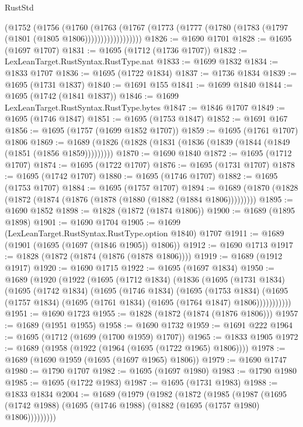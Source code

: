 \begin{lexlean}{RustStd}
\begin{coremodule}
                (@1752
                  (@1756
                    (@1760
                      (@1763
                        (@1767
                          (@1773 (@1777 (@1780 (@1783 (@1797 (@1801 (@1805 @1806))))))))))))))))))
@1826 := @1690 @1701
@1828 := @1695 (@1697 @1707)
@1831 := @1695 (@1712 (@1736 @1707))
@1832 := LexLeanTarget.RustSyntax.RustType.nat
@1833 := @1699 @1832
@1834 := @1833 @1707
@1836 := @1695 (@1722 @1834)
@1837 := @1736 @1834
@1839 := @1695 (@1731 @1837)
@1840 := @1691 @155
@1841 := @1699 @1840
@1844 := @1695 (@1742 (@1841 @1837))
@1846 := @1699 LexLeanTarget.RustSyntax.RustType.bytes
@1847 := @1846 @1707
@1849 := @1695 (@1746 @1847)
@1851 := @1695 (@1753 @1847)
@1852 := @1691 @167
@1856 := @1695 (@1757 (@1699 @1852 @1707))
@1859 := @1695 (@1761 @1707) @1806
@1869 := @1689 (@1826 (@1828 (@1831 (@1836 (@1839 (@1844 (@1849 (@1851 (@1856 @1859)))))))))
@1870 := @1690 @1840
@1872 := @1695 (@1712 @1707)
@1874 := @1695 (@1722 @1707)
@1876 := @1695 (@1731 @1707)
@1878 := @1695 (@1742 @1707)
@1880 := @1695 (@1746 @1707)
@1882 := @1695 (@1753 @1707)
@1884 := @1695 (@1757 @1707)
@1894 := @1689 (@1870 (@1828 (@1872 (@1874 (@1876 (@1878 (@1880 (@1882 (@1884 @1806)))))))))
@1895 := @1690 @1852
@1898 := @1828 (@1872 (@1874 @1806))
@1900 := @1689 (@1895 @1898)
@1901 := @1690 @1704
@1905 := @1699 (LexLeanTarget.RustSyntax.RustType.option @1840) @1707
@1911 := @1689 (@1901 (@1695 (@1697 (@1846 @1905)) @1806))
@1912 := @1690 @1713
@1917 := @1828 (@1872 (@1874 (@1876 (@1878 @1806))))
@1919 := @1689 (@1912 @1917)
@1920 := @1690 @1715
@1922 := @1695 (@1697 @1834)
@1950 := @1689
    (@1920
      (@1922
        (@1695
          (@1712 @1834)
          (@1836
            (@1695
              (@1731 @1834)
              (@1695
                (@1742 @1834)
                (@1695
                  (@1746 @1834)
                  (@1695
                    (@1753 @1834)
                    (@1695 (@1757 @1834) (@1695 (@1761 @1834) (@1695 (@1764 @1847) @1806)))))))))))
@1951 := @1690 @1723
@1955 := @1828 (@1872 (@1874 (@1876 @1806)))
@1957 := @1689 (@1951 @1955)
@1958 := @1690 @1732
@1959 := @1691 @222
@1964 := @1695 (@1712 (@1699 (@1700 @1959) @1707))
@1965 := @1833 @1905
@1972 := @1689 (@1958 (@1922 (@1964 (@1695 (@1722 @1965) @1806))))
@1978 := @1689 (@1690 @1959 (@1695 (@1697 @1965) @1806))
@1979 := @1690 @1747
@1980 := @1790 @1707
@1982 := @1695 (@1697 @1980)
@1983 := @1790 @1980
@1985 := @1695 (@1722 @1983)
@1987 := @1695 (@1731 @1983)
@1988 := @1833 @1834
@2004 := @1689
    (@1979
      (@1982
        (@1872
          (@1985
            (@1987
              (@1695 (@1742 @1988) (@1695 (@1746 @1988) (@1882 (@1695 (@1757 @1980) @1806)))))))))

\end{coremodule}
\end{lexlean}
